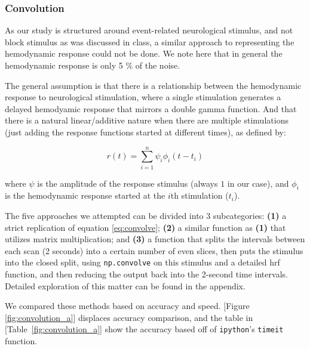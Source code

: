 \subsubsection{Convolution}
\par \indent As our study is structured around event-related neurological 
stimulus, and not block stimulus as was discussed in class, a similar 
approach to representing the hemodynamic response could not be done. 
We note here that in general the hemodynamic response is only 5 \% of 
the noise.

The general assumption is that there is a relationship between the 
hemodynamic response to neurological stimulation, where a single 
stimulation generates a delayed hemodyamic response that mirrors 
a double gamma function. And that there is a natural linear/additive 
nature when there are multiple stimulations (just adding the response 
functions started at different times), as defined by:

\begin{equation} \label{eq:convolve}
r(t)= \sum_{i=1}^n \psi_{i} \phi_{i}(t-t_i)
\end{equation}

where $\psi$ is the amplitude of the response stimulus (always $1$ in our 
case), and $\phi_{i}$ is the hemodynamic response started at the $i$th 
stimulation ($t_i$).

The five approaches we attempted can be divided into 3 subcategories: 
\textbf{(1)} a strict replication of equation \ref{eq:convolve}; \textbf{(2)} a similar 
function as \textbf{(1)} that utilizes matrix multiplication; and \textbf{(3)} a 
function that splits the intervals between each scan (2 seconds) into a certain 
number of even slices, then puts the stimulus into the closed split, using 
\texttt{np.convolve} on this stimulus and a detailed hrf function, and then 
reducing the output back into the 2-second time intervals. Detailed exploration 
of this matter can be found in the appendix.

We compared these methods based on accuracy and speed. [Figure 
\ref{fig:convolution_a}] displaces accuracy comparison, and the table in 
[Table~\ref{fig:convolution_a}] show the accuracy based off of \texttt{ipython}'s 
\texttt{timeit} function.



